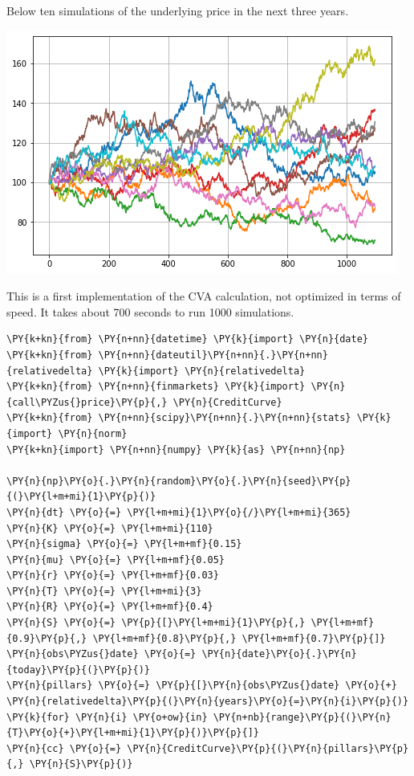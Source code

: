 \begin{Answer}
Below ten simulations of the underlying price in the next three years.

\includegraphics{figures/underlying_simulation}

This is a first implementation of the CVA calculation, not optimized in terms of speed. It takes about 700 seconds to run 1000 simulations.

\begin{tcolorbox}[size=fbox, boxrule=1pt, colback=cellbackground, colframe=cellborder]
\begin{Verbatim}[commandchars=\\\{\}]
\PY{k+kn}{from} \PY{n+nn}{datetime} \PY{k}{import} \PY{n}{date}
\PY{k+kn}{from} \PY{n+nn}{dateutil}\PY{n+nn}{.}\PY{n+nn}{relativedelta} \PY{k}{import} \PY{n}{relativedelta}
\PY{k+kn}{from} \PY{n+nn}{finmarkets} \PY{k}{import} \PY{n}{call\PYZus{}price}\PY{p}{,} \PY{n}{CreditCurve}
\PY{k+kn}{from} \PY{n+nn}{scipy}\PY{n+nn}{.}\PY{n+nn}{stats} \PY{k}{import} \PY{n}{norm}
\PY{k+kn}{import} \PY{n+nn}{numpy} \PY{k}{as} \PY{n+nn}{np}
		
\PY{n}{np}\PY{o}{.}\PY{n}{random}\PY{o}{.}\PY{n}{seed}\PY{p}{(}\PY{l+m+mi}{1}\PY{p}{)}
\PY{n}{dt} \PY{o}{=} \PY{l+m+mi}{1}\PY{o}{/}\PY{l+m+mi}{365}
\PY{n}{K} \PY{o}{=} \PY{l+m+mi}{110}
\PY{n}{sigma} \PY{o}{=} \PY{l+m+mf}{0.15}
\PY{n}{mu} \PY{o}{=} \PY{l+m+mf}{0.05}
\PY{n}{r} \PY{o}{=} \PY{l+m+mf}{0.03}
\PY{n}{T} \PY{o}{=} \PY{l+m+mi}{3}
\PY{n}{R} \PY{o}{=} \PY{l+m+mf}{0.4}
\PY{n}{S} \PY{o}{=} \PY{p}{[}\PY{l+m+mi}{1}\PY{p}{,} \PY{l+m+mf}{0.9}\PY{p}{,} \PY{l+m+mf}{0.8}\PY{p}{,} \PY{l+m+mf}{0.7}\PY{p}{]}
\PY{n}{obs\PYZus{}date} \PY{o}{=} \PY{n}{date}\PY{o}{.}\PY{n}{today}\PY{p}{(}\PY{p}{)}
\PY{n}{pillars} \PY{o}{=} \PY{p}{[}\PY{n}{obs\PYZus{}date} \PY{o}{+} \PY{n}{relativedelta}\PY{p}{(}\PY{n}{years}\PY{o}{=}\PY{n}{i}\PY{p}{)} \PY{k}{for} \PY{n}{i} \PY{o+ow}{in} \PY{n+nb}{range}\PY{p}{(}\PY{n}{T}\PY{o}{+}\PY{l+m+mi}{1}\PY{p}{)}\PY{p}{]}
\PY{n}{cc} \PY{o}{=} \PY{n}{CreditCurve}\PY{p}{(}\PY{n}{pillars}\PY{p}{,} \PY{n}{S}\PY{p}{)}
		

\end{Verbatim}
\end{tcolorbox}
\end{Answer}
